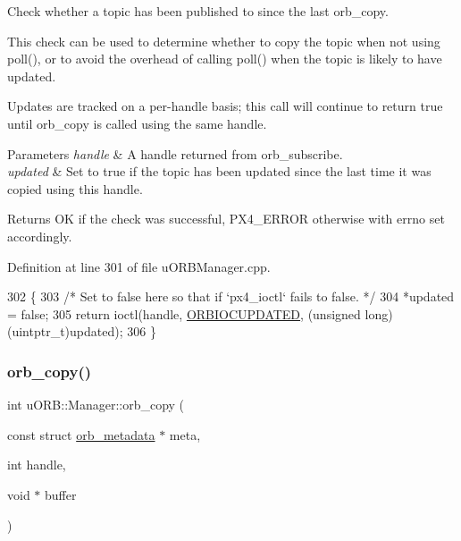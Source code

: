 Check whether a topic has been published to since the last orb\+\_\+copy.

This check can be used to determine whether to copy the topic when not using poll(), or to avoid the overhead of calling poll() when the topic is likely to have updated.

Updates are tracked on a per-\/handle basis; this call will continue to return true until orb\+\_\+copy is called using the same handle.


\begin{DoxyParams}{Parameters}
{\em handle} & A handle returned from orb\+\_\+subscribe. \\
\hline
{\em updated} & Set to true if the topic has been updated since the last time it was copied using this handle. \\
\hline
\end{DoxyParams}
\begin{DoxyReturn}{Returns}
OK if the check was successful, P\+X4\+\_\+\+E\+R\+R\+OR otherwise with errno set accordingly. 
\end{DoxyReturn}


Definition at line 301 of file u\+O\+R\+B\+Manager.\+cpp.


\begin{DoxyCode}
302 \{
303     \textcolor{comment}{/* Set to false here so that if `px4\_ioctl` fails to false. */}
304     *updated = \textcolor{keyword}{false};
305     \textcolor{keywordflow}{return} ioctl(handle, \hyperlink{drv__orb__dev_8h_a60e19540d21f9a44e9157804121957f8}{ORBIOCUPDATED}, (\textcolor{keywordtype}{unsigned} \textcolor{keywordtype}{long})(uintptr\_t)updated);
306 \}
\end{DoxyCode}
\mbox{\label{classuORB_1_1Manager_af1048c82b439300c706fe0a083b61f90}} 
\subsubsection{\texorpdfstring{orb\+\_\+copy()}{orb\_copy()}}
{\footnotesize\ttfamily int u\+O\+R\+B\+::\+Manager\+::orb\+\_\+copy (\begin{DoxyParamCaption}\item[{const struct \hyperlink{structorb__metadata}{orb\+\_\+metadata} $\ast$}]{meta,  }\item[{int}]{handle,  }\item[{void $\ast$}]{buffer }\end{DoxyParamCaption})}


